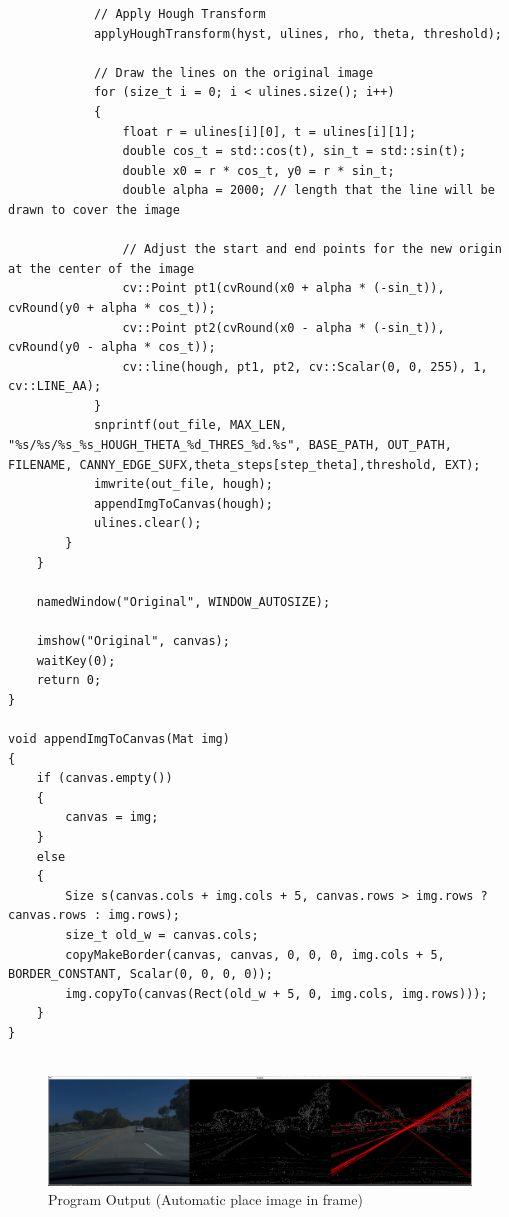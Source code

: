 \documentclass[12pt,a4paper]{report}
\begin{document}
\begin{lstlisting}
            // Apply Hough Transform
            applyHoughTransform(hyst, ulines, rho, theta, threshold);

            // Draw the lines on the original image
            for (size_t i = 0; i < ulines.size(); i++)
            {
                float r = ulines[i][0], t = ulines[i][1];
                double cos_t = std::cos(t), sin_t = std::sin(t);
                double x0 = r * cos_t, y0 = r * sin_t;
                double alpha = 2000; // length that the line will be drawn to cover the image

                // Adjust the start and end points for the new origin at the center of the image
                cv::Point pt1(cvRound(x0 + alpha * (-sin_t)), cvRound(y0 + alpha * cos_t));
                cv::Point pt2(cvRound(x0 - alpha * (-sin_t)), cvRound(y0 - alpha * cos_t));
                cv::line(hough, pt1, pt2, cv::Scalar(0, 0, 255), 1, cv::LINE_AA);
            }
            snprintf(out_file, MAX_LEN, "%s/%s/%s_%s_HOUGH_THETA_%d_THRES_%d.%s", BASE_PATH, OUT_PATH, FILENAME, CANNY_EDGE_SUFX,theta_steps[step_theta],threshold, EXT);
            imwrite(out_file, hough);
            appendImgToCanvas(hough);
            ulines.clear();
        }
    }

    namedWindow("Original", WINDOW_AUTOSIZE);

    imshow("Original", canvas);
    waitKey(0);
    return 0;
}

void appendImgToCanvas(Mat img)
{
    if (canvas.empty())
    {
        canvas = img;
    }
    else
    {
        Size s(canvas.cols + img.cols + 5, canvas.rows > img.rows ? canvas.rows : img.rows);
        size_t old_w = canvas.cols;
        copyMakeBorder(canvas, canvas, 0, 0, 0, img.cols + 5, BORDER_CONSTANT, Scalar(0, 0, 0, 0));
        img.copyTo(canvas(Rect(old_w + 5, 0, img.cols, img.rows)));
    }
}


\end{lstlisting}
\begin{figure}[!htb]
  \centering
  \includegraphics[width=1\linewidth]{program.png}
  \caption{Program Output (Automatic place image in frame)}
\end{figure}
\clearpage
\end{document}

